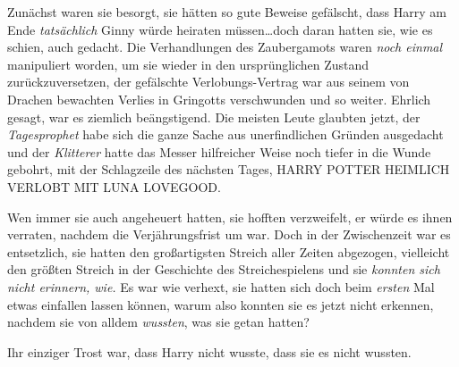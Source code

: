 Zunächst waren sie besorgt, sie hätten so gute Beweise gefälscht, dass Harry am Ende \emph{tatsächlich} Ginny würde heiraten müssen…doch daran hatten sie, wie es schien, auch gedacht. Die Verhandlungen des Zaubergamots waren \emph{noch einmal} manipuliert worden, um sie wieder in den ursprünglichen Zustand zurückzuversetzen, der gefälschte Verlobungs-Vertrag war aus seinem von Drachen bewachten Verlies in Gringotts verschwunden und so weiter. Ehrlich gesagt, war es ziemlich beängstigend. Die meisten Leute glaubten jetzt, der \emph{Tagesprophet} habe sich die ganze Sache aus unerfindlichen Gründen ausgedacht und der \emph{Klitterer} hatte das Messer hilfreicher Weise noch tiefer in die Wunde gebohrt, mit der Schlagzeile des nächsten Tages, HARRY POTTER HEIMLICH VERLOBT MIT LUNA LOVEGOOD.

Wen immer sie auch angeheuert hatten, sie hofften verzweifelt, er würde es ihnen verraten, nachdem die Verjährungsfrist um war. Doch in der Zwischenzeit war es entsetzlich, sie hatten den großartigsten Streich aller Zeiten abgezogen, vielleicht den größten Streich in der Geschichte des Streichespielens und sie \emph{konnten sich nicht erinnern, wie.} Es war wie verhext, sie hatten sich doch beim \emph{ersten} Mal etwas einfallen lassen können, warum also konnten sie es jetzt nicht erkennen, nachdem sie von alldem \emph{wussten}, was sie getan hatten?

Ihr einziger Trost war, dass Harry nicht wusste, dass sie es nicht wussten.

